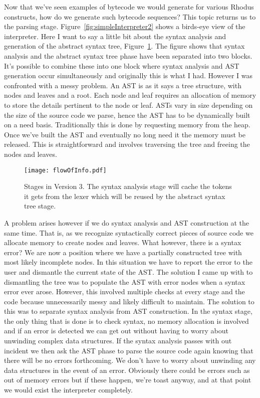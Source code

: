 Now that we've seen examples of bytecode we would generate for various Rhodus constructs, how do we generate such bytecode sequences? This topic returns us to the parsing stage. Figure~\ref{fig:simpleInterpreter2} shows a birds-eye view of the interpreter.  Here I want to say a little bit about the syntax analysis and generation of the abstract syntax tree, Figure~\ref{fig:Syntax_AST_Interaction}. The figure shows that syntax analysis and the abstract syntax tree phase have been separated into two blocks. It's possible to combine these into one block where syntax analysis and AST generation occur simultaneously and originally this is what I had. However I was confronted with a messy problem. An AST is as it says a tree structure, with nodes and leaves and a root. Each node and leaf requires an allocation of memory to store the details pertinent to the node or leaf. ASTs vary in size depending on the size of the source code we parse, hence the AST has to be dynamically built on a need basis. Traditionally this is done by requesting memory from the heap. Once we've built the AST and eventually no long need it the memory must be released. This is straightforward and involves traversing the tree and freeing the nodes and leaves.

\begin{figure}[htpb]
\centering
\texttt{[image: flowOfInfo.pdf]}
\caption{Stages in Version 3. The syntax analysis stage will cache the tokens it gets from the lexer which will be reused by the abstract syntax tree stage. }
\label{fig:Syntax_AST_Interaction}
\end{figure}

A problem arises however if we do syntax analysis and AST construction at the same time. That is, as we recognize syntactically correct pieces of source code we allocate memory to create nodes and leaves. What however, there is a syntax error? We are now a position where we have a partially constructed tree with most likely incomplete nodes. In this situation we have to report the error to the user and dismantle the current state of the AST. The solution I came up with to dismantling the tree was to populate the AST with error nodes when a syntax error ever arose. However, this involved multiple checks at every stage and the code because unnecessarily messy and likely difficult to maintain. The solution to this was to separate syntax analysis from AST construction. In the syntax stage, the only thing that is done is to check syntax, no memory allocation is involved and if an error is detected we can get out without having to worry about unwinding complex data structures. If the syntax analysis passes with out incident we then ask the AST phase to parse the source code again knowing that there will be no errors forthcoming. We don't have to worry about unwinding any data structures in the event of an error. Obviously there could be errors such as out of memory errors but if these happen, we're toast anyway, and at that point we would exist the interpreter completely.

